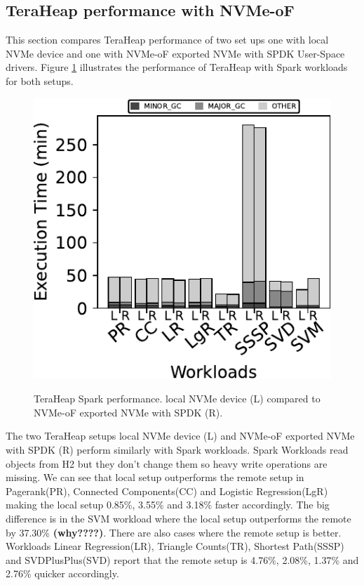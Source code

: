 \subsection{TeraHeap performance with NVMe-oF}
\par This section compares TeraHeap performance of two set ups one with local NVMe device and one with NVMe-oF exported NVMe with SPDK User-Space drivers. Figure \ref{fig:bench_spark} illustrates the performance of TeraHeap with Spark workloads for both setups.
\begin{figure}[H]
  \includegraphics[width=\linewidth]{figures/bench_spark.pdf}\\
\caption{TeraHeap Spark performance. local NVMe device (L) compared to NVMe-oF exported NVMe with SPDK (R).}
\label{fig:bench_spark}
\end{figure}
The two TeraHeap setups local NVMe device (L) and NVMe-oF exported NVMe with SPDK (R) perform similarly with Spark workloads. Spark Workloads read objects from H2 but they don't change them so heavy write operations are missing. We can see that local setup outperforms the remote setup in Pagerank(PR), Connected Components(CC) and Logistic Regression(LgR) making the local setup 0.85\%, 3.55\% and 3.18\% faster accordingly. The big difference is in the SVM workload where the local setup outperforms the remote by 37.30\% \textbf{(why????)}. There are also cases where the remote setup is better. Workloads Linear Regression(LR), Triangle Counts(TR), Shortest Path(SSSP) and SVDPlusPlus(SVD) report that the remote setup is 4.76\%, 2.08\%, 1.37\% and 2.76\% quicker accordingly.
